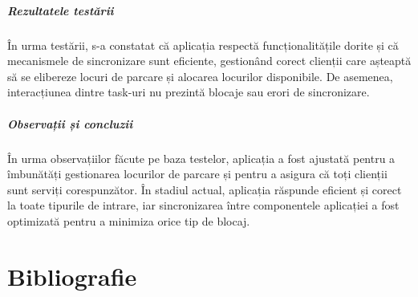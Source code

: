 \documentclass[a4paper,11pt]{report}
\begin{document}
\paragraph{Rezultatele testării}

În urma testării, s-a constatat că aplicația respectă funcționalitățile dorite și că mecanismele de sincronizare sunt eficiente, gestionând corect clienții care așteaptă să se elibereze locuri de parcare și alocarea locurilor disponibile. De asemenea, interacțiunea dintre task-uri nu prezintă blocaje sau erori de sincronizare.

\paragraph{Observații și concluzii}

În urma observațiilor făcute pe baza testelor, aplicația a fost ajustată pentru a îmbunătăți gestionarea locurilor de parcare și pentru a asigura că toți clienții sunt serviți corespunzător. În stadiul actual, aplicația răspunde eficient și corect la toate tipurile de intrare, iar sincronizarea între componentele aplicației a fost optimizată pentru a minimiza orice tip de blocaj.


\chapter{Bibliografie}
\end{document}
